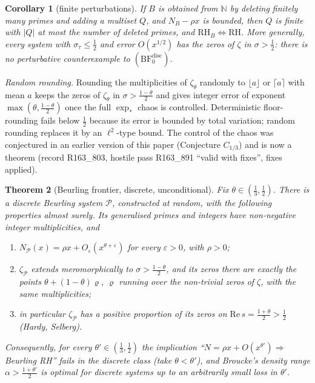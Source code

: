 \documentclass[11pt]{amsart}
\newtheorem{theorem}{Theorem}[section]
\newtheorem{corollary}[theorem]{Corollary}
\theoremstyle{definition}
\theoremstyle{remark}
\newcommand{\N}{\mathbb N}
\newcommand{\Rel}{\mathrm{Re}\,}
\begin{document}
\begin{corollary}[finite perturbations]\label{cor:finitepert}
If $B$ is obtained from $\N$ by deleting finitely many primes and adding a multiset $Q$, and $N_B-\rho x$ is bounded,
then $Q$ is finite with $|Q|$ at most the number of deleted primes, and $\mathrm{RH}_B\iff\mathrm{RH}$. More generally,
every system with $\sigma_\tau\le\frac12$ and error $O(x^{1/2})$ has the zeros of $\zeta$ in $\sigma>\frac12$: there is no
perturbative counterexample to $(\mathrm{BF}^{\mathrm{disc}}_0)$.
\end{corollary}

\emph{Random rounding.} Rounding the multiplicities of $\zeta_\theta$ randomly to $\lfloor a\rfloor$ or
$\lceil a\rceil$ with mean $a$ keeps the zeros of $\zeta_\theta$ in $\sigma>\frac{1-\theta}2$ and gives integer error of
exponent $\max(\theta,\frac{1-\theta}2)$ once the full $\exp_*$ chaos is controlled. Deterministic floor-rounding
\cite[Thm.~6.3]{Broucke2024} fails below $\frac12$ because its error is bounded by total variation; random rounding
replaces it by an $\ell^2$-type bound. The control of the chaos was conjectured in an earlier version of this paper
(Conjecture $C_{1/3}$) and is now a theorem (record R163\_803, hostile pass R163\_891 ``valid with fixes'', fixes applied).

\begin{theorem}[Beurling frontier, discrete, unconditional]\label{thm:BFdisc}
Fix $\theta\in(\frac13,\frac12)$. There is a discrete Beurling system $\mathcal P$, constructed at random, with the
following properties almost surely. Its generalised primes and integers have non-negative integer multiplicities, and
\begin{enumerate}
\item[(i)] $N_{\mathcal P}(x)=\rho x+O_\varepsilon(x^{\theta+\varepsilon})$ for every $\varepsilon>0$, with $\rho>0$;
\item[(ii)] $\zeta_{\mathcal P}$ extends meromorphically to $\sigma>\frac{1-\theta}2$, and its zeros there are exactly the points
$\theta+(1-\theta)\varrho$, $\varrho$ running over the non-trivial zeros of $\zeta$, with the same multiplicities;
\item[(iii)] in particular $\zeta_{\mathcal P}$ has a positive proportion of its zeros on $\Rel s=\frac{1+\theta}2>\frac12$ (Hardy, Selberg).
\end{enumerate}
Consequently, for every $\theta'\in(\frac13,\frac12)$ the implication ``$N=\rho x+O(x^{\theta'})\Rightarrow$ Beurling RH'' fails in
the discrete class (take $\theta<\theta'$), and Broucke's density range $\alpha>\frac{1+\theta'}2$ \cite{Broucke2024} is optimal for
discrete systems up to an arbitrarily small loss in $\theta'$.
\end{theorem}
\end{document}
